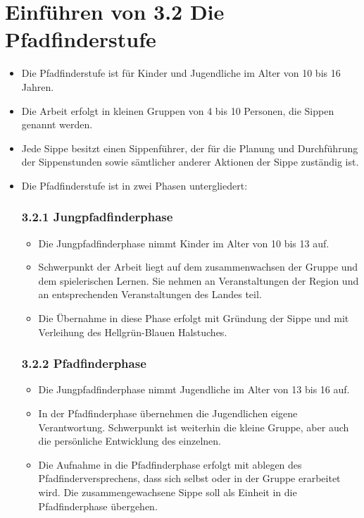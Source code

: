 \documentclass[a4paper]{article}
\begin{document}
\section{Einführen von 3.2 Die Pfadfinderstufe} %
\label{sec:anpassung_der_ordnung_auf_die_neue_beauftragung}
    \label{sub:die_pfadfinderstufe}
    \begin{itemize}
        \item Die Pfadfinderstufe ist für Kinder und Jugendliche im Alter von 10 bis 16 Jahren. 
        \item Die Arbeit erfolgt in kleinen Gruppen von 4 bis 10 Personen, die Sippen genannt werden.
        \item Jede Sippe besitzt einen Sippenführer, der für die Planung und Durchführung der Sippenstunden sowie sämtlicher anderer Aktionen der Sippe zuständig ist. 
        \item Die Pfadfinderstufe ist in zwei Phasen untergliedert:
        \subsubsection*{3.2.1 Jungpfadfinderphase} %
        \label{ssub:jungpfadfinderphase}
            \begin{itemize}
                \item Die Jungpfadfinderphase nimmt Kinder im Alter von 10 bis 13 auf.
                \item Schwerpunkt der Arbeit liegt auf dem zusammenwachsen der Gruppe und dem spielerischen Lernen. Sie nehmen an Veranstaltungen der Region und an entsprechenden Veranstaltungen des Landes teil.
                \item Die Übernahme in diese Phase erfolgt mit Gründung der Sippe und mit Verleihung des Hellgrün-Blauen Halstuches.
            \end{itemize}
        \subsubsection*{3.2.2 Pfadfinderphase} %
        \label{ssub:pfadfinderphase}
        \begin{itemize}
            \item Die Jungpfadfinderphase nimmt Jugendliche im Alter von 13 bis 16 auf.
            \item In der Pfadfinderphase übernehmen die Jugendlichen eigene Verantwortung. Schwerpunkt ist weiterhin die kleine Gruppe, aber auch die persönliche Entwicklung des einzelnen. 
            \item Die Aufnahme in die Pfadfinderphase erfolgt mit ablegen des Pfadfinderversprechens, dass sich selbst oder in der Gruppe erarbeitet wird. Die zusammengewachsene Sippe soll als Einheit in die Pfadfinderphase übergehen.
        \end{itemize}
    \end{itemize}
\end{document}

